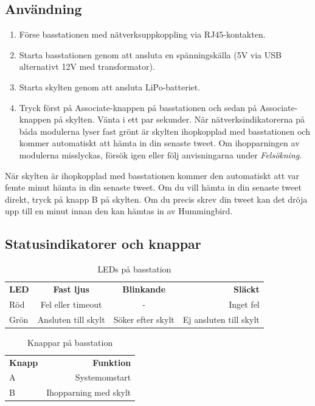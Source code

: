 \documentclass[a4paper,11pt]{article}
\begin{document}
\subsection{Användning}

\begin{enumerate}
    \item Förse basstationen med nätverksuppkoppling via RJ45-kontakten.
    \item Starta basstationen genom att ansluta en spänningskälla (5V via USB alternativt 12V med transformator).
    \item Starta skylten genom att ansluta LiPo-batteriet.
    \item Tryck först på Associate-knappen på basstationen och sedan på Associate-knappen på skylten. Vänta i ett par sekunder. När nätverksindikatorerna på båda modulerna lyser fast grönt är skylten ihopkopplad med basstationen och kommer automatiskt att hämta in din senaste tweet. Om ihopparningen av modulerna misslyckas, försök igen eller följ anvisningarna under {\it Felsökning}.
\end{enumerate}

När skylten är ihopkopplad med basstationen kommer den automatiskt att var femte minut hämta in din senaste tweet. Om du vill hämta in din senaste tweet direkt, tryck på knapp B på skylten. Om du precis skrev din tweet kan det dröja upp till en minut innan den kan hämtas in av Hummingbird.
		
\subsection{Statusindikatorer och knappar}

\begin{table}[h!]
\centering
    \begin{tabular}{|l|c|c|r|}
    {\bf LED} & {\bf Fast ljus} & {\bf Blinkande} & {\bf Släckt} \\
    Röd & Fel eller timeout & - & Inget fel \\
    Grön & Ansluten till skylt & Söker efter skylt & Ej ansluten till skylt \\
    \end{tabular}
\caption{LEDs på basstation}
\label{tab:ledtable_base}
\end{table}


\begin{table}[h!]
\centering
    \begin{tabular}{|l|r|}
    {\bf Knapp} & {\bf Funktion} \\
    A & Systemomstart \\
    B & Ihopparning med skylt \\
    \end{tabular}
\caption{Knappar på basstation}
\label{tab:btntable_base}
\end{table}
\end{document}
